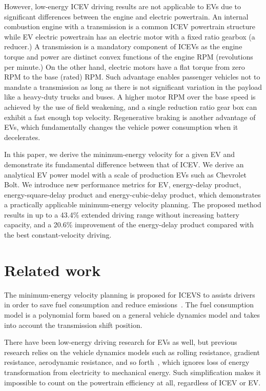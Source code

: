 \documentclass{IEEEtran}
\begin{document}
However, low-energy ICEV driving results are not applicable to EVs due to significant differences 
between the engine  and electric  powertrain. An internal combustion engine with a transmission is a common ICEV powertrain structure while EV electric powertrain has an electric motor with a fixed ratio gearbox (a reducer.) A transmission is a mandatory component of ICEVs as the engine torque and power are distinct convex functions of the engine RPM (revolutions per minute.) On the other hand, electric motors have a flat torque from zero RPM to the base (rated) RPM. Such advantage enables passenger vehicles not to mandate a transmission as long as there is not significant variation in the payload like a heavy-duty trucks and buses. A higher motor RPM over the base speed is achieved by the use of field weakening, and a single reduction ratio gear box can exhibit a fast enough top velocity. Regenerative braking is another advantage of EVs, which fundamentally changes the vehicle power consumption when it decelerates.

In this paper, we derive the minimum-energy velocity for a given EV and demonstrate its fundamental difference between that of ICEV. 
We derive an analytical EV power model with a scale of production EVs such as Chevrolet  Bolt. We introduce new performance metrics for EV, energy-delay product, energy-square-delay product and energy-cubic-delay product, which demonstrates a practically applicable minimum-energy velocity planning. The proposed method results in up to a 43.4\% extended driving range without increasing battery capacity, and a 20.6\% improvement of the energy-delay product compared with the best constant-velocity driving. 

\section{Related work} \label{sec:related work}
  
The minimum-energy velocity planning is proposed for ICEVS to assists drivers in order to save fuel consumption and reduce emissions~\cite{Seraens:thesis12, Kamal:TITS11, Ozatay:TITS14, Dovgana:ASC14, Ozatay:IFAC14, Khayyam:ESA12}.  
The fuel consumption model is a polynomial form based on a general vehicle dynamics model and takes into account the transmission shift position. 

There have been low-energy driving research for EVs as well, but previous research relies on the  vehicle dynamics models such as rolling resistance, gradient resistance, aerodynamic resistance, and so forth~\cite{Yan:NAPS14}, which ignores loss of energy transformation from electricity to mechanical energy. Such simplification makes it impossible to count on the powertrain efficiency at all, regardless of ICEV or EV. 
\end{document}
